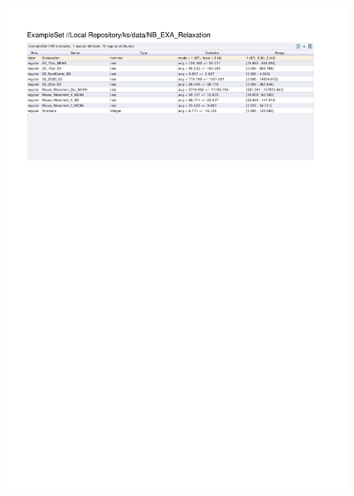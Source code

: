 \begin{figure}[htp]
  \centerline{\includegraphics[trim=0 640 0 60,clip,width=16.09cm]{results/NB_EXA_Relaxation.pdf}} \caption{
} \label{NB_K_Relaxation}
\end{figure}

